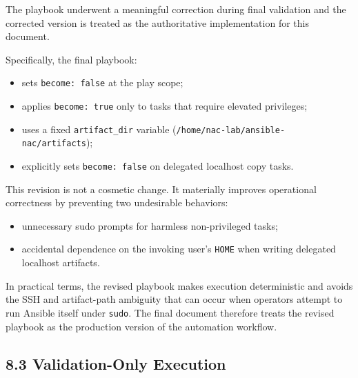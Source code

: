\documentclass[11pt]{article}
\begin{document}
The playbook underwent a meaningful correction during final validation and the corrected version is treated as the authoritative implementation for this document.

Specifically, the final playbook:

\begin{itemize}
    \item sets \texttt{become: false} at the play scope;
    \item applies \texttt{become: true} only to tasks that require elevated privileges;
    \item uses a fixed \texttt{artifact\_dir} variable (\texttt{/home/nac-lab/ansible-nac/artifacts});
    \item explicitly sets \texttt{become: false} on delegated localhost copy tasks.
\end{itemize}

This revision is not a cosmetic change. It materially improves operational correctness by preventing two undesirable behaviors:

\begin{itemize}
    \item unnecessary sudo prompts for harmless non-privileged tasks;
    \item accidental dependence on the invoking user's \texttt{HOME} when writing delegated localhost artifacts.
\end{itemize}

In practical terms, the revised playbook makes execution deterministic and avoids the SSH and artifact-path ambiguity that can occur when operators attempt to run Ansible itself under \texttt{sudo}. The final document therefore treats the revised playbook as the production version of the automation workflow.


\subsection{8.3 Validation-Only Execution}
\label{sec:validation-only-execution}
\end{document}
